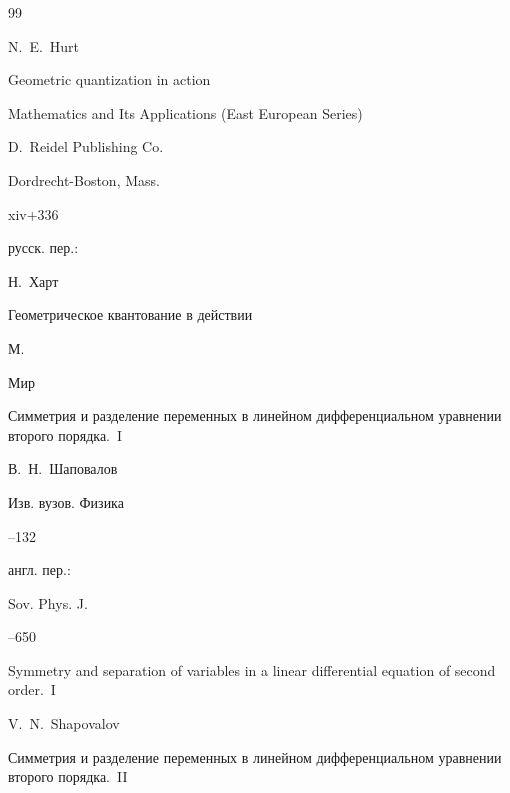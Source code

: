 \begin{thebibliography}{99}




\by N.~E.~Hurt

\book Geometric quantization in action 

\serial Mathematics and Its Applications (East European Series)


\publ D.~Reidel Publishing Co.

\publaddr Dordrecht-Boston, Mass.


\totalpages xiv+336

\rtransl русск. пер.:~

\by Н.~Харт 

\book Геометрическое квантование в действии

\publaddr М.

\publ Мир










\paper Симметрия и разделение переменных в линейном дифференциальном уравнении второго порядка.~I

\by В.~Н.~Шаповалов

\jour Изв. вузов. Физика



--132

\transl англ. пер.:~

\jour Sov. Phys. J.




--650

\paper Symmetry and separation of variables in a linear differential equation of second order.~I

\by V.~N.~Shapovalov 








\paper Симметрия и разделение переменных в линейном дифференциальном уравнении второго порядка.~II


\end{thebibliography}

